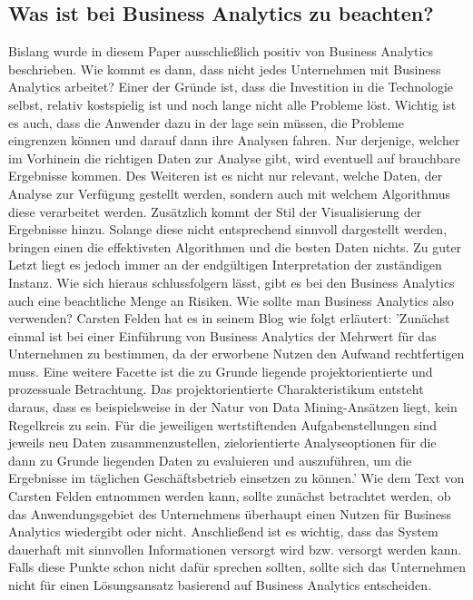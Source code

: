 \documentclass[12pt,twocolumn,twoside]{conference}   %
\begin{document}
\subsection{Was ist bei Business Analytics zu beachten?}
Bislang wurde in diesem Paper ausschließlich positiv von Business Analytics beschrieben. Wie kommt es dann, dass nicht jedes Unternehmen mit Business Analytics arbeitet? Einer der Gründe ist, dass die Investition in die Technologie selbst, relativ kostspielig ist und noch lange nicht alle Probleme löst. Wichtig ist es auch, dass die Anwender dazu in der lage sein müssen, die Probleme eingrenzen können und darauf dann ihre Analysen fahren. Nur derjenige, welcher im Vorhinein die richtigen Daten zur Analyse gibt, wird eventuell auf brauchbare Ergebnisse kommen. Des Weiteren ist es nicht nur relevant, welche Daten, der Analyse zur Verfügung gestellt werden, sondern auch mit welchem Algorithmus diese verarbeitet werden. Zusätzlich kommt der Stil der Visualisierung der Ergebnisse hinzu. Solange diese nicht entsprechend sinnvoll dargestellt werden, bringen einen die effektivsten Algorithmen und die besten Daten nichts. Zu guter Letzt liegt es jedoch immer an der endgültigen Interpretation der zuständigen Instanz. Wie sich hieraus schlussfolgern lässt, gibt es bei den Business Analytics auch eine beachtliche Menge an Risiken. Wie sollte man Business Analytics also verwenden? Carsten Felden hat es in seinem Blog wie folgt erläutert: 'Zunächst einmal ist bei einer Einführung von Business Analytics der Mehrwert für das Unternehmen zu bestimmen, da der erworbene Nutzen den Aufwand rechtfertigen muss. Eine weitere Facette ist die zu Grunde liegende projektorientierte und prozessuale Betrachtung. Das projektorientierte Charakteristikum entsteht daraus, dass es beispielsweise in der Natur von Data Mining-Ansätzen liegt, kein Regelkreis zu sein. Für die jeweiligen wertstiftenden Aufgabenstellungen sind jeweils neu Daten zusammenzustellen, zielorientierte Analyseoptionen für die dann zu Grunde liegenden Daten zu evaluieren und auszuführen, um die Ergebnisse im täglichen Geschäftsbetrieb einsetzen zu können.' \cite{Beispiel1:2016} Wie dem Text von Carsten Felden entnommen werden kann, sollte zunächst betrachtet werden, ob das Anwendungsgebiet des Unternehmens überhaupt einen Nutzen für Business Analytics wiedergibt oder nicht. Anschließend ist es wichtig, dass das System dauerhaft mit sinnvollen Informationen versorgt wird bzw. versorgt werden kann. Falls diese Punkte schon nicht dafür sprechen sollten, sollte sich das Unternehmen   nicht für einen Lösungsansatz basierend auf Business Analytics entscheiden.
\end{document}
